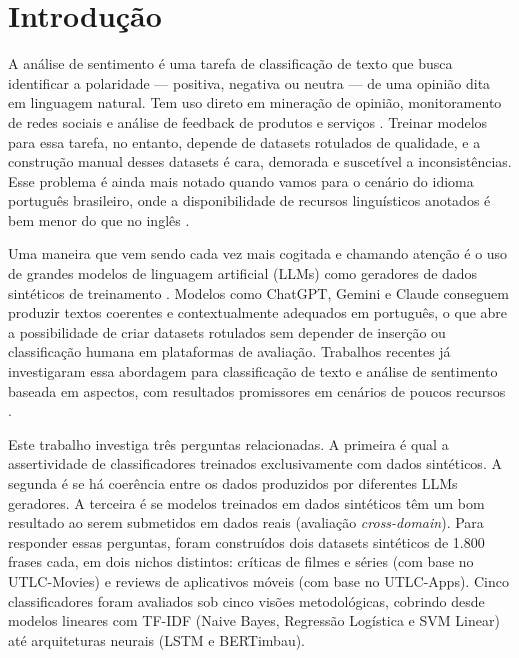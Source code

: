 \documentclass[12pt]{article}
\begin{document}

\section{Introdução}

A análise de sentimento é uma tarefa de classificação de texto que busca identificar a polaridade — positiva, negativa ou neutra — de uma opinião dita em linguagem natural. Tem uso direto em mineração de opinião, monitoramento de redes sociais e análise de feedback de produtos e serviços \cite{jm3}. Treinar modelos para essa tarefa, no entanto, depende de datasets rotulados de qualidade, e a construção manual desses datasets é cara, demorada e suscetível a inconsistências. Esse problema é ainda mais notado quando vamos para o cenário do idioma português brasileiro, onde a disponibilidade de recursos linguísticos anotados é bem menor do que no inglês \cite{souza2022brazilian}.

Uma maneira que vem sendo cada vez mais cogitada e chamando atenção é o uso de grandes modelos de linguagem artificial (LLMs) como geradores de dados sintéticos de treinamento \cite{liu2024best, nadas2025synthetic}. Modelos como ChatGPT, Gemini e Claude conseguem produzir textos coerentes e contextualmente adequados em português, o que abre a possibilidade de criar datasets rotulados sem depender de inserção ou classificação humana em plataformas de avaliação. Trabalhos recentes já investigaram essa abordagem para classificação de texto e análise de sentimento baseada em aspectos, com resultados promissores em cenários de poucos recursos \cite{li2023synthetic, hellwig2025exploring}.

Este trabalho investiga três perguntas relacionadas. A primeira é qual a assertividade de classificadores treinados exclusivamente com dados sintéticos. A segunda é se há coerência entre os dados produzidos por diferentes LLMs geradores. A terceira é se modelos treinados em dados sintéticos têm um bom resultado ao serem submetidos em dados reais (avaliação \textit{cross-domain}). Para responder essas perguntas, foram construídos dois datasets sintéticos de 1.800 frases cada, em dois nichos distintos: críticas de filmes e séries (com base no UTLC-Movies) e reviews de aplicativos móveis (com base no UTLC-Apps). Cinco classificadores foram avaliados sob cinco visões metodológicas, cobrindo desde modelos lineares com TF-IDF (Naive Bayes, Regressão Logística e SVM Linear) até arquiteturas neurais (LSTM e BERTimbau).
\end{document}
